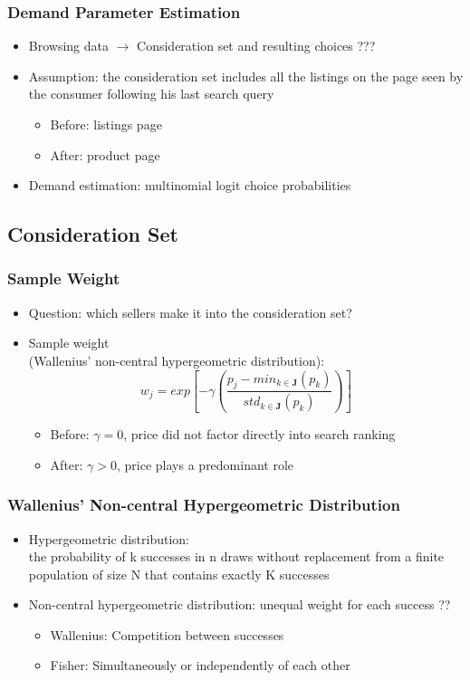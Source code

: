 \documentclass{beamer}
\begin{document}
\begin{frame}
\frametitle{Demand Parameter Estimation}
\begin{itemize}
\item Browsing data $\to$ Consideration set and resulting choices ???
\item Assumption: the consideration set includes all the listings on the page seen by the consumer following his last search query
\begin{itemize}
\item Before: listings page
\item After: product page
\end{itemize}
\item Demand estimation: multinomial logit choice probabilities
\end{itemize}
\end{frame}

\subsection{Consideration Set}
\begin{frame}
\frametitle{Sample Weight}
\begin{itemize}
\item Question: which sellers make it into the consideration set?
\item Sample weight\\(Wallenius' non-central hypergeometric distribution): 
$$
w_j = exp[
-\gamma 
(
\frac{p_j- min_{k\in \mathbf{J}} (p_k)}{std_{k\in \mathbf{J}}(p_k)}
)
]
$$
\begin{itemize}
\item Before: $\gamma=0$, price did not factor directly into search ranking
\item After: $\gamma>0$, price plays a predominant role  
\end{itemize}
\end{itemize}
\end{frame}

\begin{frame}
\frametitle{Wallenius' Non-central Hypergeometric Distribution}
\begin{itemize}
\item Hypergeometric distribution: \\ \quad the probability of k successes in n draws without replacement from a finite population of size N that contains exactly K successes
\item Non-central hypergeometric distribution: unequal weight for each success   ??
  \begin{itemize}
  \item Wallenius: Competition between successes
  \item Fisher: Simultaneously or independently of each other
  \end{itemize} 
\end{itemize}
\end{frame}
\end{document}
